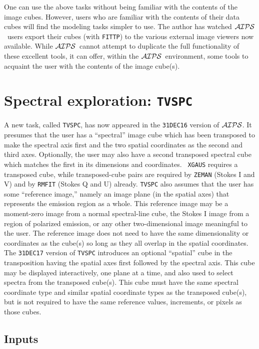 \documentclass[twoside]{article}
\newcommand{\AIPS}{{$\cal AIPS\/$}}
\begin{document}
One can use the above tasks without being familiar with the contents
of the image cubes.  However, users who are familiar with the contents
of their data cubes will find the modeling tasks simpler to use.  The
author has watched \AIPS\ users export their cubes (with {\tt FITTP})
to the various external image viewers now available.  While \AIPS\
cannot attempt to duplicate the full functionality of these excellent
tools, it can offer, within the \AIPS\ environment, some tools to
acquaint the user with the contents of the image cube(s).

\section{Spectral exploration: {\tt TVSPC}}

A new task, called {\tt TVSPC}, has now appeared in the {\tt 31DEC16}
version of \AIPS\@.  It presumes that the user has a ``spectral''
image cube which has been transposed to make the spectral axis first
and the two spatial coordinates as the second and third axes.
Optionally, the user may also have a second transposed spectral cube
which matches the first in its dimensions and coordinates.  {\tt
  XGAUS} requires a transposed cube, while transposed-cube pairs are
required by {\tt ZEMAN} (Stokes I and V) and by {\tt RMFIT} (Stokes Q
and U) already.  {\tt TVSPC} also assumes that the user has some
``reference image,'' namely an image plane (in the spatial axes) that
represents the emission region as a whole.  This reference image may
be a moment-zero image from a normal spectral-line cube, the Stokes I
image from a region of polarized emission, or any other
two-dimensional image meaningful to the user.  The reference image
does not need to have the same dimensionality or coordinates as the
cube(s) so long as they all overlap in the spatial coordinates.  The
{\tt 31DEC17} version of {\tt TVSPC} introduces an optional
``spatial'' cube in the transposition having the spatial axes first
followed by the spectral axis.  This cube may be displayed
interactively, one plane at a time, and also used to select spectra
from the transposed cube(s).  This cube must have the same spectral
coordinate type and similar spatial coordinate types as the transposed
cube(s), but is not required to have the same reference values,
increments, or pixels as those cubes.

\subsection{Inputs}
\end{document}
